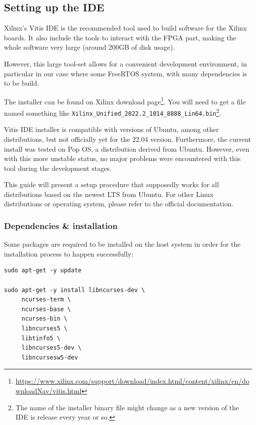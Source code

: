 \documentclass[10pt]{article}
\begin{document}
\subsection{Setting up the IDE}
\label{sec:orge9d5314}
Xilinx's Vitis IDE is the recommended tool used to build software for the Xilinx boards.
It also include the tools to interact with the FPGA part, making the whole
software very large (around 200GB of disk usage).

However, this large tool-set allows for a convenient development environment, in particular
in our case where some FreeRTOS system, with many dependencies is to be build.

The installer can be found on Xilinx download page\footnote{\url{https://www.xilinx.com/support/download/index.html/content/xilinx/en/downloadNav/vitis.html}}. You will need to get
a file named something like \texttt{Xilinx\_Unified\_2022.2\_1014\_8888\_Lin64.bin}\footnote{The name of the installer binary file might change as a new version of
the IDE is release every year or so.}.

Vitis IDE installer is compatible with versions of Ubuntu, among other distributions,
but not officially yet for the 22.04 version.
Furthermore, the current install was tested on Pop OS, a distribution derived from Ubuntu.
However, even with this more unstable status, no major problems were encountered
with this tool during the development stages.

This guide will present a setup procedure that supposedly works for all distributions based on the newest
LTS from Ubuntu. For other Linux distributions or operating system, please refer to the official documentation.

\subsubsection{Dependencies \& installation}
\label{sec:org7cc45ee}
Some packages are required to be installed on the host system
in order for the installation process to happen successfully:

\begin{verbatim}
sudo apt-get -y update

sudo apt-get -y install libncurses-dev \
     ncurses-term \
     ncurses-base \
     ncurses-bin \
     libncurses5 \
     libtinfo5 \
     libncurses5-dev \
     libncursesw5-dev
\end{verbatim}
\end{document}
